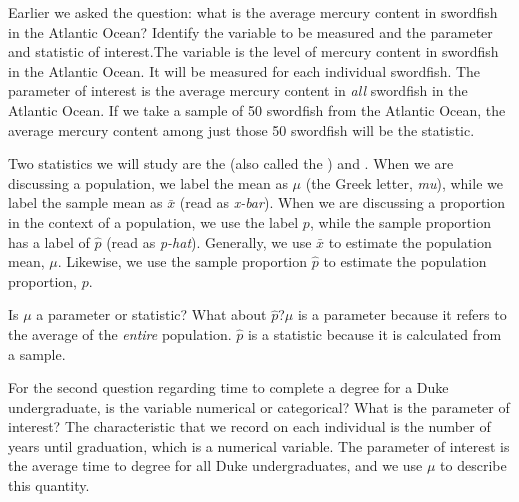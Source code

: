 \begin{examplewrap}
\begin{nexample}{Earlier we asked the question: what is the average mercury content in swordfish in the Atlantic Ocean? Identify the variable to be measured and the parameter and statistic of interest.}The variable is the level of mercury content in swordfish in the Atlantic Ocean. It will be measured for each individual swordfish. The parameter of interest is the average mercury content in \emph{all} swordfish in the Atlantic Ocean. If we take a sample of 50 swordfish from the Atlantic Ocean, the average mercury content among just those 50 swordfish will be the statistic.
\end{nexample}
\end{examplewrap}

Two statistics we will study are the  (also called the ) and . When we are discussing a population, we label the mean as $\mu$ (the Greek letter, \emph{mu}), while we label the sample mean as $\bar{x}$ (read as \emph{x-bar}). When we are discussing a proportion in the context of a population, we use the label $p$, while the sample proportion has a label of $\hat{p}$ (read as \emph{p-hat}). Generally, we use $\bar{x}$ to estimate the population mean, $\mu$. Likewise, we use the sample proportion $\hat{p}$ to estimate the population proportion, $p$.

\begin{examplewrap}
\begin{nexample}{Is $\mu$ a parameter or statistic? What about $\hat{p}$?}$\mu$ is a parameter because it refers to the average of the \emph{entire} population. $\hat{p}$ is a statistic because it is calculated from a sample.
\end{nexample}
\end{examplewrap}

\begin{examplewrap}
\begin{nexample}{For the second question regarding time to complete a degree for a Duke undergraduate, is the variable numerical or categorical? What is the parameter of interest?}
The characteristic that we record on each individual is the number of years until graduation, which is a numerical variable. The parameter of interest is the average time to degree for all Duke undergraduates, and we use $\mu$ to describe this quantity.
\end{nexample}
\end{examplewrap}

